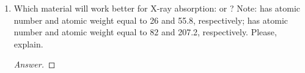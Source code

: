 \documentclass[../psets.tex]{subfiles}
\begin{document}
\begin{enumerate}
    \begin{proof}[Answer]
        From the Duane-Hunt law, we know that the frequency $f$ at which the most X-rays are emitted is given by $f=Ve/h$. Additionally, we know that $c=\lambda f$. Therefore,
        \begin{align*}
            \lambda &= \frac{c}{f}\\
            &= \frac{ch}{Ve}\\
            &= \frac{(\SI{2.998e8}{\meter\per\second})(\SI{6.626e-34}{\joule\second})}{(\SI{3.5e4}{\electronvolt})(\SI{1.602e-19}{\coulomb})}\\
            \Aboxed{\lambda &= \SI{35}{\pico\meter}}
        \end{align*}
        meaning that these are hard X-rays.
    \end{proof}
    \item Which material will work better for X-ray absorption:  or ? Note:  has atomic number and atomic weight equal to 26 and 55.8, respectively;  has atomic number and atomic weight equal to 82 and 207.2, respectively. Please, explain.
    \begin{proof}[Answer]


\end{proof}
\end{enumerate}
\end{document}
